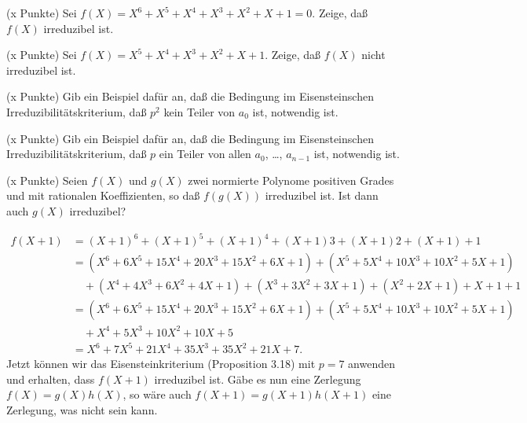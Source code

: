 \documentclass{algsheet}
\author{Dipl.-Math.~Arturo Mancino}
\date{08.~Dezember 2010}
\begin{document}
                \maketitle


\begin{exercise}(x Punkte)\newline
    Sei \(f(X) = X^6 + X^5 + X^4 + X^3 + X^2 + X + 1 = 0\). Zeige, daß
    \(f(X)\) irreduzibel ist.
\end{exercise}

\begin{exercise}(x Punkte)\newline
    Sei \(f(X) = X^5 + X^4 + X^3 + X^2 + X + 1\). Zeige, daß \(f(X)\) nicht
    irreduzibel ist.
\end{exercise}

\begin{exercise}(x Punkte)\newline
	Gib ein Beispiel dafür an, daß die Bedingung im
	Eisensteinschen Irreduzibilitätskriterium,
	daß \(p^2\) kein Teiler von \(a_0\) ist, notwendig ist.
\end{exercise}

\begin{exercise}(x Punkte)\newline
	Gib ein Beispiel dafür an, daß die Bedingung im
	Eisensteinschen Irreduzibilitätskriterium,
	daß \(p\) ein Teiler von allen \(a_0\), \dots, \(a_{n - 1}\) ist,
	notwendig ist. 
\end{exercise}

\begin{exercise}(x Punkte)\newline
    Seien \(f(X)\) und \(g(X)\) zwei normierte Polynome positiven Grades
    und mit rationalen Koeffizienten, so daß \(f(g(X))\) irreduzibel ist.
    Ist dann auch \(g(X)\) irreduzibel?
\end{exercise}



\begin{exercise}
 \[\begin{split} f(X+1)&=(X+1)^6+(X+1)^5+(X+1)^4+(X+1)3+(X+1)2+(X+1)+1\\
     &=(X^6+6X^5+15X^4+20X^3+15X^2+6X+1)+(X^5+5X^4+10X^3+10X^2+5X+1)\\&\quad+(X^4+4X^3+6X^2+4X+1)
        +(X^3 + 3 X^2 + 3 X + 1) + (X^2 + 2 X
        + 1) + X + 1 + 1\\
 &=(X^6+6X^5+15X^4+20X^3+15X^2+6X+1)+(X^5+5X^4+10X^3+10X^2+5X+1)\\&\quad+X^4 + 5 X^3 + 10 X^2 + 10 X + 5\\
 &=X^6+7X^5+21X^4+35X^3+35X^2+21X+7.  \end{split}\]                                                       
Jetzt können wir das Eisensteinkriterium (Proposition 3.18) mit $p=7$ anwenden und erhalten, dass $f(X+1)$ irreduzibel ist.
Gäbe es nun eine Zerlegung $f(X)=g(X)h(X)$, so wäre auch $f(X+1)=g(X+1)h(X+1)$ eine Zerlegung, was nicht sein kann. 
\end{exercise}
\end{document}
